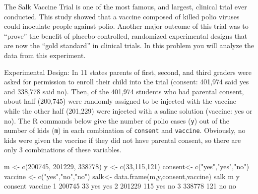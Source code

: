 \documentclass[
]{article}
\newenvironment{Shaded}{\begin{snugshade}}{\end{snugshade}}
\newcommand{\DecValTok}[1]{\textcolor[rgb]{0.00,0.00,0.81}{#1}}
\newcommand{\FunctionTok}[1]{\textcolor[rgb]{0.00,0.00,0.00}{#1}}
\newcommand{\NormalTok}[1]{#1}
\newcommand{\OtherTok}[1]{\textcolor[rgb]{0.56,0.35,0.01}{#1}}
\newcommand{\StringTok}[1]{\textcolor[rgb]{0.31,0.60,0.02}{#1}}
\begin{document}
The Salk Vaccine Trial is one of the most famous, and largest, clinical
trial ever conducted. This study showed that a vaccine composed of
killed polio viruses could inoculate people against polio. Another major
outcome of this trial was to ``prove'' the benefit of
placebo-controlled, randomized experimental designs that are now the
``gold standard'' in clinical trials. In this problem you will analyze
the data from this experiment.

Experimental Design: In 11 states parents of first, second, and third
graders were asked for permission to enroll their child into the trial
(consent: 401,974 said yes and 338,778 said no). Then, of the 401,974
students who had parental consent, about half (200,745) were randomly
assigned to be injected with the vaccine while the other half (201,229)
were injected with a saline solution (vaccine: yes or no). The R
commands below give the number of polio cases (\texttt{y}) out of the
number of kids (\texttt{m}) in each combination of \texttt{consent} and
\texttt{vaccine}. Obviously, no kids were given the vaccine if they did
not have parental consent, so there are only 3 combinations of these
variables.

\begin{Shaded}
\begin{Highlighting}[]
\NormalTok{m }\OtherTok{\textless{}{-}} \FunctionTok{c}\NormalTok{(}\DecValTok{200745}\NormalTok{, }\DecValTok{201229}\NormalTok{, }\DecValTok{338778}\NormalTok{)}
\NormalTok{y }\OtherTok{\textless{}{-}} \FunctionTok{c}\NormalTok{(}\DecValTok{33}\NormalTok{,}\DecValTok{115}\NormalTok{,}\DecValTok{121}\NormalTok{)}
\NormalTok{consent}\OtherTok{\textless{}{-}} \FunctionTok{c}\NormalTok{(}\StringTok{"yes"}\NormalTok{,}\StringTok{"yes"}\NormalTok{,}\StringTok{"no"}\NormalTok{)}
\NormalTok{vaccine }\OtherTok{\textless{}{-}} \FunctionTok{c}\NormalTok{(}\StringTok{"yes"}\NormalTok{,}\StringTok{"no"}\NormalTok{,}\StringTok{"no"}\NormalTok{)}
\NormalTok{salk}\OtherTok{\textless{}{-}} \FunctionTok{data.frame}\NormalTok{(m,y,consent,vaccine)}
\NormalTok{salk}
\NormalTok{       m   y consent vaccine}
\DecValTok{1} \DecValTok{200745}  \DecValTok{33}\NormalTok{     yes     yes}
\DecValTok{2} \DecValTok{201229} \DecValTok{115}\NormalTok{     yes      no}
\DecValTok{3} \DecValTok{338778} \DecValTok{121}\NormalTok{      no      no}
\end{Highlighting}
\end{Shaded}
\end{document}
